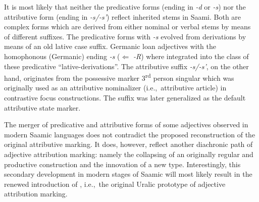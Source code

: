 {
It is most likely that neither the predicative forms (ending in \textit{-d} or \textit{-s}) nor the attributive form (ending in \textit{-s/-s'}) reflect inherited stems in Saami. Both are complex forms which are derived from either nominal or verbal stems by means of different suffixes. The predicative forms with \textit{-s} evolved from derivations by means of an old lative case suffix. Germanic loan adjectives with the homophonous (Germanic) ending \textit{-s} ($\Leftarrow$  \textit{-R}) where integrated into the class of these predicative “lative-derivations”. The attributive suffix \textit{-s/-s'}, on the other hand, originates from the possessive marker 3\textsuperscript{rd} person singular which was originally used as an attributive nominalizer (i.e.,~attributive article) in contrastive focus constructions. The suffix was later generalized as the default attributive state marker.

The merger of predicative and attributive forms of some adjectives observed in modern Saamic languages does not contradict the proposed reconstruction of the original attributive marking. It does, however, reflect another diachronic path of adjective attribution marking: namely the collapsing of an originally regular and productive construction and the innovation of a new type. Interestingly, this secondary development in modern stages of Saamic will most likely result in the renewed introduction of , i.e.,~the original Uralic prototype of adjective attribution marking.

}
